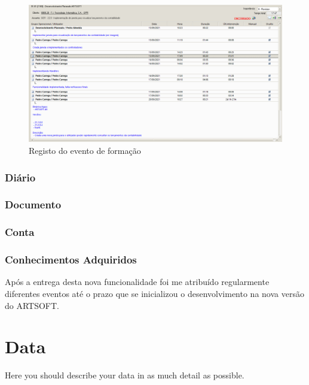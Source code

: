 \documentclass[sigplan]{acmart}
\begin{document}
\begin{figure}[htbp]
	\centerline{\includegraphics[width=\linewidth]{figures/evento_formacao.png}}
	\caption{Registo do evento de formação}
	\label{fig2}
\end{figure}

\subsubsection{Diário}

\subsubsection{Documento}

\subsubsection{Conta}

\subsubsection{Conhecimentos Adquiridos}

 Após a entrega desta nova funcionalidade foi me atribuído regularmente diferentes eventos até o prazo que se inicializou o desenvolvimento na nova versão do ARTSOFT.

\section{Data} \label{sec:data}

Here you should describe your data in as much detail as possible. \\ 
\end{document}
